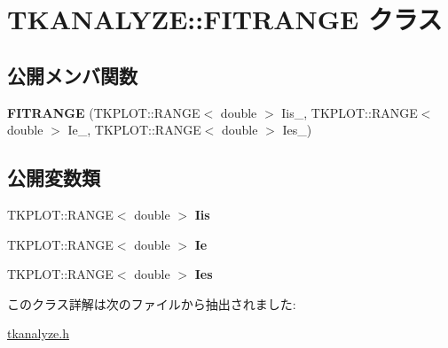 \hypertarget{class_t_k_a_n_a_l_y_z_e_1_1_f_i_t_r_a_n_g_e}{}\section{T\+K\+A\+N\+A\+L\+Y\+ZE\+:\+:F\+I\+T\+R\+A\+N\+GE クラス}
\label{class_t_k_a_n_a_l_y_z_e_1_1_f_i_t_r_a_n_g_e}
\subsection*{公開メンバ関数}
\begin{DoxyCompactItemize}
\item 
\mbox{\label{class_t_k_a_n_a_l_y_z_e_1_1_f_i_t_r_a_n_g_e_a5c329b0c3f0c0326809c71c460d7cee8}} 
{\bfseries F\+I\+T\+R\+A\+N\+GE} (T\+K\+P\+L\+O\+T\+::\+R\+A\+N\+GE$<$ double $>$ Iis\+\_\+, T\+K\+P\+L\+O\+T\+::\+R\+A\+N\+GE$<$ double $>$ Ie\+\_\+, T\+K\+P\+L\+O\+T\+::\+R\+A\+N\+GE$<$ double $>$ Ies\+\_\+)
\end{DoxyCompactItemize}
\subsection*{公開変数類}
\begin{DoxyCompactItemize}
\item 
\mbox{\label{class_t_k_a_n_a_l_y_z_e_1_1_f_i_t_r_a_n_g_e_ab11e12d473ea08ccf5d5fd46e6cd8e75}} 
T\+K\+P\+L\+O\+T\+::\+R\+A\+N\+GE$<$ double $>$ {\bfseries Iis}
\item 
\mbox{\label{class_t_k_a_n_a_l_y_z_e_1_1_f_i_t_r_a_n_g_e_ad5e58e58eb386f890c9fab2b6cc47849}} 
T\+K\+P\+L\+O\+T\+::\+R\+A\+N\+GE$<$ double $>$ {\bfseries Ie}
\item 
\mbox{\label{class_t_k_a_n_a_l_y_z_e_1_1_f_i_t_r_a_n_g_e_afee8e472d8fbb46d3112b0b6ba0f2edd}} 
T\+K\+P\+L\+O\+T\+::\+R\+A\+N\+GE$<$ double $>$ {\bfseries Ies}
\end{DoxyCompactItemize}


このクラス詳解は次のファイルから抽出されました\+:\begin{DoxyCompactItemize}
\item 
\hyperlink{tkanalyze_8h}{tkanalyze.\+h}\end{DoxyCompactItemize}
